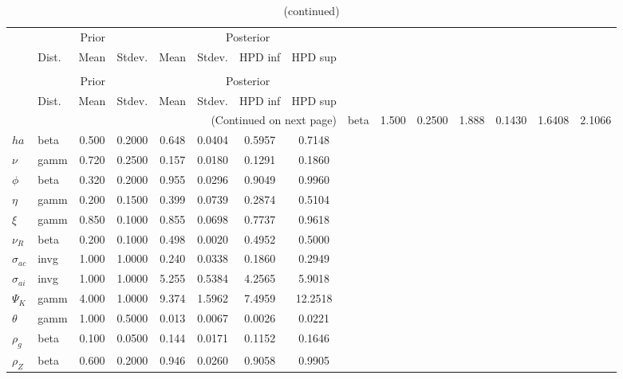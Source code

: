  
\begin{center}
\begin{longtable}{llcccccc} 
\caption{Results from Metropolis-Hastings (parameters)}
 \label{Table:MHPosterior:1}\\
\toprule 
  & \multicolumn{3}{c}{Prior}  &  \multicolumn{4}{c}{Posterior} \\
  \cmidrule(r{.75em}){2-4} \cmidrule(r{.75em}){5-8}
  & Dist. & Mean  & Stdev. & Mean & Stdev. & HPD inf & HPD sup\\
\midrule \endfirsthead 
\caption{(continued)}\\\toprule 
  & \multicolumn{3}{c}{Prior}  &  \multicolumn{4}{c}{Posterior} \\
  \cmidrule(r{.75em}){2-4} \cmidrule(r{.75em}){5-8}
  & Dist. & Mean  & Stdev. & Mean & Stdev. & HPD inf & HPD sup\\
\midrule \endhead 
\bottomrule \multicolumn{8}{r}{(Continued on next page)} \endfoot 
\bottomrule \endlastfoot 
${\sigma}$ & beta &   1.500 & 0.2500 &   1.888& 0.1430 &  1.6408 &  2.1066 \\ 
${ha}$ & beta &   0.500 & 0.2000 &   0.648& 0.0404 &  0.5957 &  0.7148 \\ 
$\nu$ & gamm &   0.720 & 0.2500 &   0.157& 0.0180 &  0.1291 &  0.1860 \\ 
${\phi}$ & beta &   0.320 & 0.2000 &   0.955& 0.0296 &  0.9049 &  0.9960 \\ 
${\eta}$ & gamm &   0.200 & 0.1500 &   0.399& 0.0739 &  0.2874 &  0.5104 \\ 
$\xi$ & gamm &   0.850 & 0.1000 &   0.855& 0.0698 &  0.7737 &  0.9618 \\ 
${\nu_R}$ & beta &   0.200 & 0.1000 &   0.498& 0.0020 &  0.4952 &  0.5000 \\ 
${\sigma_{ac}}$ & invg &   1.000 & 1.0000 &   0.240& 0.0338 &  0.1860 &  0.2949 \\ 
${\sigma_{ai}}$ & invg &   1.000 & 1.0000 &   5.255& 0.5384 &  4.2565 &  5.9018 \\ 
${\Psi_{K}}$ & gamm &   4.000 & 1.0000 &   9.374& 1.5962 &  7.4959 & 12.2518 \\ 
${\theta}$ & gamm &   1.000 & 0.5000 &   0.013& 0.0067 &  0.0026 &  0.0221 \\ 
${\rho_g}$ & beta &   0.100 & 0.0500 &   0.144& 0.0171 &  0.1152 &  0.1646 \\ 
${\rho_Z}$ & beta &   0.600 & 0.2000 &   0.946& 0.0260 &  0.9058 &  0.9905 \\ 

\end{longtable}
\end{center}
